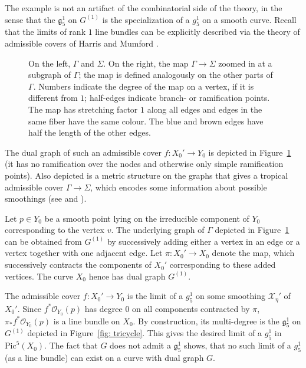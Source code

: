 \documentclass[11pt]{amsart}
\newcommand{\cX}{\mathcal X}
\begin{document}
The example is not an artifact of the combinatorial side of the theory, in the sense that the $\mathfrak g_5^1$ on $G^{(1)}$ is the specialization of a $g_5^1$ on a smooth curve. Recall that the limits of rank $1$ line bundles can be explicitly described via the theory of admissible covers of Harris and Mumford \cite{HM}. 

\begin{figure}[ht]
\caption{On the left, $\Gamma$ and $\Sigma$. On the right, the map $\Gamma \to \Sigma$ zoomed in at a subgraph of $\Gamma$; the map is defined analogously on the other parts of $\Gamma$. Numbers indicate the degree of the map on a vertex, if it is different from $1$; half-edges indicate branch- or ramification points. The map has stretching factor $1$ along all edges and edges in the same fiber have the same colour. The blue and brown edges have half the length of the other edges.}
\label{fig2}
\end{figure}

The dual graph of such an admissible cover $f \colon X_0' \to Y_0$ is depicted in Figure~\ref{fig2} (it has no ramification over the nodes and otherwise only simple ramification points). 
Also depicted is a metric structure on the graphs that gives a tropical admissible cover $\Gamma \to \Sigma$, which encodes some information about possible smoothings (see \cite{ABBRI} and \cite{CMR}). %


Let $p \in Y_0$ be a smooth point lying on the irreducible component of $Y_0$ corresponding to the vertex $v$. The underlying graph of $\Gamma$ depicted in Figure~\ref{fig2} can be obtained from $G^{(1)}$ by successively adding either a vertex in an edge or a vertex together with one adjacent edge. Let $\pi \colon X_0' \to X_0$ denote the map, which successively contracts the components of $X_0'$ corresponding to these added vertices. The curve $X_0$ hence has dual graph $G^{(1)}$. 

The admissible cover $f \colon X_0' \to Y_0$ is the limit of a $g_5^1$ on some smoothing $\cX_\eta'$ of $X_0'$. Since $f^* \mathcal O_{Y_0}(p)$ has degree $0$ on all components contracted by $\pi$, $\pi_* f^* \mathcal O_{Y_0}(p)$ is a line bundle on $X_0$. By construction, its multi-degree is the $\mathfrak g_5^1$ on $G^{(1)}$ depicted in Figure~\ref{fig: tricycle}. This gives the desired limit of a $g_5^1$ in $\mathrm{Pic}^5(X_0)$.
The fact that $G$ does not admit a $\mathfrak g_5^1$ shows, that no such limit of a $g_5^1$ (as a line bundle) can exist on a curve with dual graph $G$. 
\end{document}

